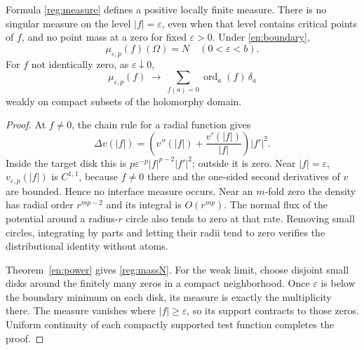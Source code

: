 \begin{proposition}\label{reg:mass}
Formula \eqref{reg:measure} defines a positive locally finite measure.
There is no singular measure on the level $|f|=\varepsilon$, even when
that level contains critical points of $f$, and no point mass at a zero
for fixed $\varepsilon>0$. Under \eqref{en:boundary},
\begin{equation}\label{reg:massN}
 \mu_{\varepsilon,p}(f)(\Omega)=N\quad(0<\varepsilon<b).
\end{equation}
For $f$ not identically zero, as $\varepsilon\downarrow0$,
\begin{equation}\label{reg:divisorlimit}
 \mu_{\varepsilon,p}(f)\ \longrightarrow\
       \sum_{f(a)=0}\operatorname{ord}_a(f)\,\delta_a
\end{equation}
weakly on compact subsets of the holomorphy domain.
\end{proposition}
\begin{proof}
At $f\ne0$, the chain rule for a radial function gives
\[
 \Delta v(|f|)=\left(v''(|f|)+\frac{v'(|f|)}{|f|}\right)|f'|^2.
\]
Inside the target disk this is $p\varepsilon^{-p}|f|^{p-2}|f'|^2$;
outside it is zero. Near $|f|=\varepsilon$, $v_{\varepsilon,p}(|f|)$ is
$C^{1,1}$, because $f\ne0$ there and the one-sided second derivatives of
$v$ are bounded. Hence no interface measure occurs. Near an $m$-fold
zero the density has radial order $r^{mp-2}$ and its integral is
$O(r^{mp})$. The normal flux of the potential around a radius-$r$ circle
also tends to zero at that rate. Removing small circles, integrating by
parts and letting their radii tend to zero verifies the distributional
identity without atoms.

Theorem~\ref{en:power} gives \eqref{reg:massN}. For the weak limit,
choose disjoint small disks around the finitely many zeros in a compact
neighborhood. Once $\varepsilon$ is below the boundary minimum on each
disk, its measure is exactly the multiplicity there. The measure vanishes
where $|f|\ge\varepsilon$, so its support contracts to those zeros.
Uniform continuity of each compactly supported test function completes
the proof.
\end{proof}

